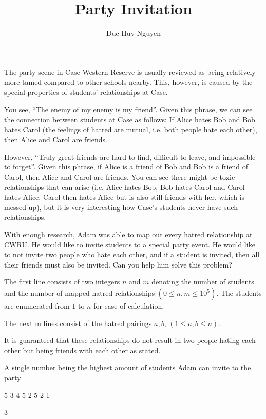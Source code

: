 \documentclass{article}
\title{Party Invitation}
\author{Duc Huy Nguyen}
\begin{document}
\begin{problemDescription}

    The party scene in Case Western Reserve is usually reviewed as being relatively more tamed compared to other schools nearby. This, however, is caused by the special properties of students’ relationships at Case.

    You see, “The enemy of my enemy is my friend”. Given this phrase, we can see the connection between students at Case as follows: If Alice hates Bob and Bob hates Carol (the feelings of hatred are mutual, i.e. both people hate each other), then Alice and Carol are friends. 
    
    However, “Truly great friends are hard to find, difficult to leave, and impossible to forget”. Given this phrase, if Alice is a friend of Bob and Bob is a friend of Carol, then Alice and Carol are friends. You can see there might be toxic relationships that can arise (i.e. Alice hates Bob, Bob hates Carol and Carol hates Alice. Carol then hates Alice but is also still friends with her, which is messed up), but it is very interesting how Case’s students never have such relationships.

    With enough research, Adam was able to map out every hatred relationship at CWRU. He would like to invite students to a special party event. He would like to not invite two people who hate each other, and if a student is invited, then all their friends must also be invited. Can you help him solve this problem?

\end{problemDescription}

\begin{inputDescription}

    The first line consists of two integers $n$ and $m$ denoting the number of students and the number of mapped hatred relationships $(0 \leq n, m \leq 10^5)$. The students are enumerated from $1$ to $n$ for ease of calculation.

    The next m lines consist of the hatred pairings $a, b$, $(1 \leq a, b \leq n)$.

    It is guaranteed that these relationships do not result in two people hating each other but being friends with each other as stated.
    

\end{inputDescription}

\begin{outputDescription}
    A single number being the highest amount of students Adam can invite to the party
\end{outputDescription}

\begin{sampleInput}
5 3
4 5
2 5
2 1
\end{sampleInput}
\begin{sampleOutput}
3
\end{sampleOutput}
\end{document}
